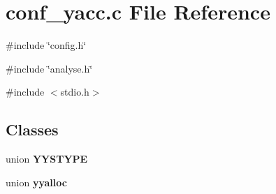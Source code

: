 \section{conf\_\-yacc.c File Reference}
\label{conf__yacc_8c}
{\ttfamily \#include \char`\"{}config.h\char`\"{}}\par
{\ttfamily \#include \char`\"{}analyse.h\char`\"{}}\par
{\ttfamily \#include $<$stdio.h$>$}\par
\subsection*{Classes}
\begin{DoxyCompactItemize}
\item 
union {\bf YYSTYPE}
\item 
union {\bf yyalloc}
\end{DoxyCompactItemize}
